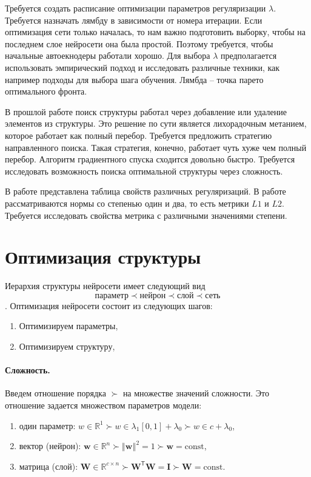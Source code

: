 \documentclass[12pt, twoside]{article}
\newenvironment{comment}{}{}
\newcommand{\wvec}{{\mathbf{W}}}
\newcommand{\wm}{{\mathbf{w}}}
\begin{document}
\begin{comment}
Требуется создать расписание оптимизации параметров регуляризации $\lambda$. Требуется назначать лямбду в зависимости от номера итерации. Если оптимизация сети только началась, то нам важно подготовить выборку, чтобы на последнем слое нейросети она была простой. Поэтому требуется, чтобы начальные автоекнодеры работали хорошо. Для выбора $\lambda$ предполагается использовать эмпирический подход и исследовать различные техники, как например подходы для выбора шага обучения. Лямбда – точка парето оптимального фронта.

В прошлой работе поиск структуры работал через добавление или удаление элементов из структуры. Это решение по сути является лихорадочным метанием, которое работает как полный перебор. Требуется предложить стратегию направленного поиска. Такая стратегия, конечно, работает чуть хуже чем полный перебор. 
Алгоритм градиентного спуска сходится довольно быстро. Требуется исследовать возможность поиска оптимальной структуры через сложность. 




В работе \cite{wang2018learning} представлена таблица свойств различных регуляризаций. В работе рассматриваются нормы со степенью один и два, то есть метрики $L1$ и $L2$. Требуется исследовать свойства метрика с различными значениями степени. 




\section{Оптимизация структуры}
Иерархия структуры нейросети имеет следующий вид
$$\text{параметр} \prec \text{нейрон} \prec \text{слой} \prec \text{сеть}$$.
Оптимизация нейросети состоит из следующих шагов:
\begin{enumerate}
\item[1)]
Оптимизируем параметры,
\item[2)]
Оптимизируем структуру,
\end{enumerate}

\paragraph{Сложность.}
Введем отношение порядка $\succ$ на множестве значений сложности. Это отношение задается множеством параметров модели:
\begin{enumerate}[1)]
\item один параметр: $w\in \mathbb{R}^1 \succ w \in \lambda_1 [0,1] +\lambda_0 \succ w\in c +\lambda_0$,
\item вектор (нейрон): $\wm\in \mathbb{R}^n \succ \left\Vert \wm \right\Vert^2 =1 \succ \wm= \text{const}$,
\item матрица (слой): $\wvec\in \mathbb{R}^{c{\times}n} \succ \wvec^\mathsf{T}\wvec = \mathbf{I} \succ \wvec= \text{const}$.
\end{enumerate}


\end{comment}
\end{document}
